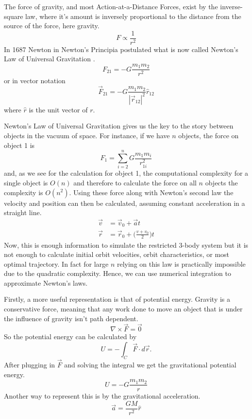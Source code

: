 \documentclass{article}
\begin{document}
The force of gravity, and most Action-at-a-Distance Forces, exist by the inverse-square law, where it's amount is inversely proportional to the distance from the source of the force, here gravity. $$F\propto \frac{1}{r^2}$$ In 1687 Newton in Newton's Principia postulated what is now called Newton's Law of Universal Gravitation \cite{rohrlich_1999}. $$F_{21}=-G\frac{m_1m_2}{r^2}$$ or in vector notation 
\begin{equation}
\vec{F}_{21}=-G\frac{m_1m_2}{|\vec{r}_{12}|^2}\hat{r}_{12}
\end{equation}
 where $\hat{r}$ is the unit vector of $r$.

Newton's Law of Universal Gravitation gives us the key to the story between objects in the vacuum of space. For instance, if we have $n$ objects, the force on object 1 is $$F_1=\sum_{i=2}^n{G\frac{m_1 m_i}{r_{1i}^2}}$$ and, as we see for the calculation for object 1, the computational complexity for a single object is $O(n)$ and therefore to calculate the force on all $n$ objects the complexity is $O(n^2)$. Using these force along with Newton's second law the velocity and position can then be calculated, assuming constant acceleration in a straight line.
\begin{align}
	\vec{v} &= \vec{v}_0+\vec{a}t \label{eq:vel}\\
	\vec{r} &= \vec{r}_0+\Big(\frac{v+v_0}{2}\Big)t\label{eq:pos}
\end{align}
Now, this is enough information to simulate the restricted 3-body system but it is not enough to calculate initial orbit velocities, orbit characteristics, or most optimal trajectory. In fact for large $n$ relying on this law is practically impossible due to the quadratic complexity. Hence, we can use numerical integration to approximate Newton's laws.

Firstly, a more useful representation is that of potential energy. Gravity is a conservative force, meaning that any work done to move an object that is under the influence of gravity isn't path dependent. $$\nabla\times \vec{F}=\vec{0}$$ 
So the potential energy can be calculated by $$U=-\int_C \vec{F}\cdot d\vec{r}.$$ After plugging in $\vec{F}$ and solving the integral we get the gravitational potential energy.
\begin{equation} \label{eq:gravpotential}
U=-G\frac{m_1m_2}{r}
\end{equation}
Another way to represent this is by the gravitational acceleration. 
\begin{equation}
\vec{a}=\frac{GM}{r^2}\hat{r}
\end{equation}
\end{document}
